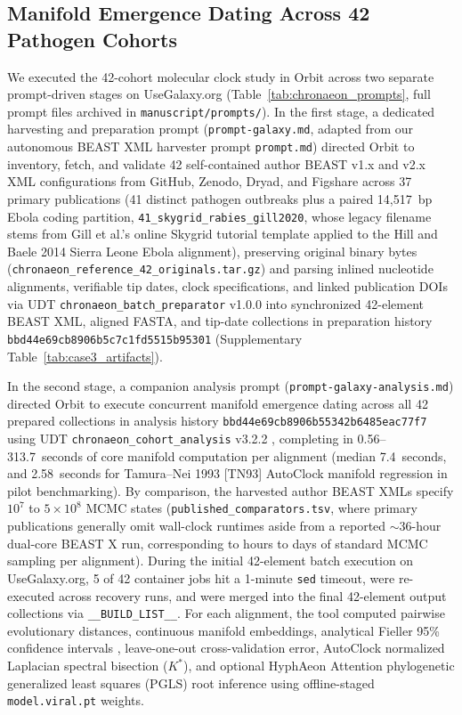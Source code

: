 \documentclass[11pt,letterpaper]{article}
\newcommand{\tool}[1]{\textsf{#1}}
\begin{document}
\subsection*{Manifold Emergence Dating Across 42 Pathogen Cohorts}
We executed the 42-cohort molecular clock study in \tool{Orbit} across two separate prompt-driven stages on UseGalaxy.org (Table~\ref{tab:chronaeon_prompts}, full prompt files archived in \nolinkurl{manuscript/prompts/}). In the first stage, a dedicated harvesting and preparation prompt (\nolinkurl{prompt-galaxy.md}, adapted from our autonomous \tool{BEAST} XML harvester prompt \nolinkurl{prompt.md}) directed \tool{Orbit} to inventory, fetch, and validate 42 self-contained author \tool{BEAST} v1.x and v2.x XML configurations from GitHub, Zenodo, Dryad, and Figshare across 37 primary publications (41 distinct pathogen outbreaks plus a paired 14,517~bp Ebola coding partition, \nolinkurl{41_skygrid_rabies_gill2020}, whose legacy filename stems from Gill et al.'s \cite{gill2020skygrid} online Skygrid tutorial template applied to the Hill and Baele \cite{hill2019skygrid} 2014 Sierra Leone Ebola alignment), preserving original binary bytes (\nolinkurl{chronaeon_reference_42_originals.tar.gz}) and parsing inlined nucleotide alignments, verifiable tip dates, clock specifications, and linked publication DOIs via UDT \nolinkurl{chronaeon_batch_preparator} v1.0.0 into synchronized 42-element \tool{BEAST} XML, aligned FASTA, and tip-date collections in preparation history \nolinkurl{bbd44e69cb8906b5c7c1fd5515b95301} (Supplementary Table~\ref{tab:case3_artifacts}).

In the second stage, a companion analysis prompt (\nolinkurl{prompt-galaxy-analysis.md}) directed \tool{Orbit} to execute concurrent manifold emergence dating across all 42 prepared collections in analysis history \nolinkurl{bbd44e69cb8906b55342b6485eac77f7} using UDT \nolinkurl{chronaeon_cohort_analysis} v3.2.2 \cite{pond2026hyphaeon}, completing in 0.56--313.7~seconds of core manifold computation per alignment (median 7.4~seconds, and 2.58~seconds for Tamura--Nei 1993 [TN93] \tool{AutoClock} manifold regression in pilot benchmarking). By comparison, the harvested author \tool{BEAST} XMLs specify $10^7$ to $5 \times 10^8$ MCMC states (\nolinkurl{published_comparators.tsv}, where primary publications generally omit wall-clock runtimes aside from a reported $\sim 36$-hour dual-core \tool{BEAST X} run, corresponding to hours to days of standard MCMC sampling per alignment). During the initial 42-element batch execution on UseGalaxy.org, 5 of 42 container jobs hit a 1-minute \texttt{sed} timeout, were re-executed across recovery runs, and were merged into the final 42-element output collections via \nolinkurl{__BUILD_LIST__}. For each alignment, the tool computed pairwise evolutionary distances, continuous manifold embeddings, analytical Fieller 95\% confidence intervals \cite{fieller1954some}, leave-one-out cross-validation error, \tool{AutoClock} normalized Laplacian spectral bisection ($K^*$), and optional \tool{HyphAeon} Attention phylogenetic generalized least squares (PGLS) root inference using offline-staged \nolinkurl{model.viral.pt} weights.
\end{document}
